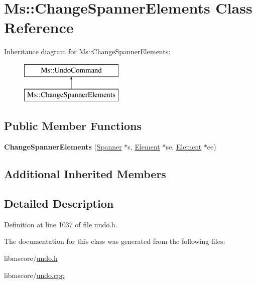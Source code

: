 \hypertarget{class_ms_1_1_change_spanner_elements}{}\section{Ms\+:\+:Change\+Spanner\+Elements Class Reference}
\label{class_ms_1_1_change_spanner_elements}
Inheritance diagram for Ms\+:\+:Change\+Spanner\+Elements\+:\begin{figure}[H]
\begin{center}
\leavevmode
\includegraphics[height=2.000000cm]{class_ms_1_1_change_spanner_elements}
\end{center}
\end{figure}
\subsection*{Public Member Functions}
\begin{DoxyCompactItemize}
\item 
\mbox{\label{class_ms_1_1_change_spanner_elements_a637fd7bd07504511a1de14672699ec66}} 
{\bfseries Change\+Spanner\+Elements} (\hyperlink{class_ms_1_1_spanner}{Spanner} $\ast$s, \hyperlink{class_ms_1_1_element}{Element} $\ast$se, \hyperlink{class_ms_1_1_element}{Element} $\ast$ee)
\end{DoxyCompactItemize}
\subsection*{Additional Inherited Members}


\subsection{Detailed Description}


Definition at line 1037 of file undo.\+h.



The documentation for this class was generated from the following files\+:\begin{DoxyCompactItemize}
\item 
libmscore/\hyperlink{undo_8h}{undo.\+h}\item 
libmscore/\hyperlink{undo_8cpp}{undo.\+cpp}\end{DoxyCompactItemize}

